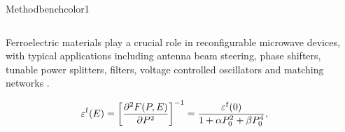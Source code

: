 \documentclass[final,12pt]{beamer} %
\begin{document}
\begin{frame}
\begin{textblock*}{38.5cm}
\begin{posterblock}{Method}{benchcolor1}

\begin{columns}[t,totalwidth=\columnwidth]
\begin{column}{.55\columnwidth}

  Ferroelectric materials play a crucial role in reconfigurable
  microwave devices, with typical applications including antenna beam steering,
  phase shifters, tunable power splitters, filters, voltage controlled oscillators and
  matching networks \cite{tagantsev_ferroelectric_2018}. 


\begin{equation}
 \varepsilon^{\rm f}(E) = \left[\frac{\partial^2 F (P, E)}{\partial P^2} \right]^{-1} = \frac{\varepsilon^{\rm f}(0)}{1 + \alpha P_0^2 + \beta P_0^4},
 \label{eq_epsf}
\end{equation}






\end{column}
\begin{column}{.40\columnwidth}
% 

\end{column}
\end{columns}




\end{posterblock}
\end{textblock*}
\end{frame}
\end{document}

